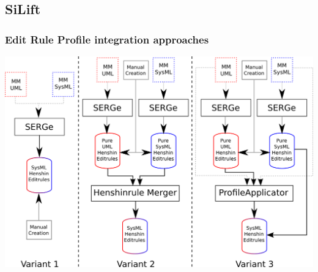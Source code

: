 \documentclass[10pt]{beamer}
\begin{document}
\subsection{SiLift}
\begin{frame}
\frametitle{Edit Rule Profile integration approaches}
\begin{center}
\includegraphics[scale=0.6]{variants_overview}\\
\end{center}
\end{frame}
\end{document}
